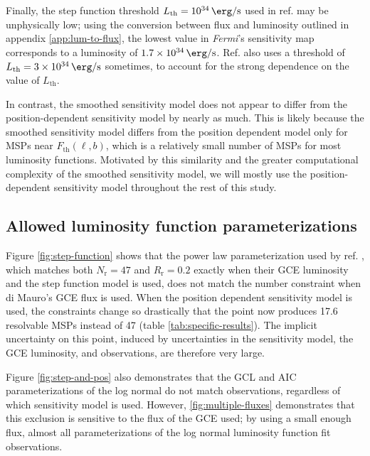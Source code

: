 \documentclass[a4paper,11pt]{article}
\newcommand{\comment}[1]{\emph{\color{red}{#1}}}
\begin{document}
Finally, the step function threshold $L_\text{th}=\SI{e34}{\erg\per\second}$ used in ref. \cite{Zhong:2019ycb} may be unphysically low; using the conversion between flux and luminosity outlined in appendix \ref{app:lum-to-flux}, the lowest value in \textit{Fermi}'s sensitivity map corresponds to a luminosity of $\SI{1.7e34}{\erg\per\second}$. Ref. \cite{Zhong:2019ycb} also uses a threshold of $L_\text{th}=\SI{3e34}{\erg\per\second}$ sometimes, to account for the strong dependence on the value of $L_\text{th}$. \comment{They don't actually say why they use 3e34. Is it fair to put words in their mouth? Also, maybe I should use 3e34. It wouldn't actually be that hard.}

In contrast, the smoothed sensitivity model does not appear to differ from the position-dependent sensitivity model by nearly as much. \comment{Except the power law, which may be a bug?} This is likely because the smoothed sensitivity model differs from the position dependent model only for MSPs near $F_\text{th}(\ell, b)$, which is a relatively small number of MSPs for most luminosity functions. Motivated by this similarity and the greater computational complexity of the smoothed sensitivity model, we will mostly use the position-dependent sensitivity model throughout the rest of this study.


\subsection{Allowed luminosity function parameterizations}
Figure \ref{fig:step-function} shows that the power law parameterization used by ref. \cite{Zhong:2019ycb}, which matches both $N_\text{r}=47$ and $R_\text{r}=0.2$ exactly when their GCE luminosity and the step function model is used, does not match the number constraint when di Mauro's GCE flux is used. When the position dependent sensitivity model is used, the constraints change so drastically that the point now produces 17.6 resolvable MSPs instead of 47 (table \ref{tab:specific-results}). The implicit uncertainty on this point, induced by uncertainties in the sensitivity model, the GCE luminosity, and observations, are therefore very large.

Figure \ref{fig:step-and-pos} also demonstrates that the GCL and AIC parameterizations of the log normal do not match observations, regardless of which sensitivity model is used. However, \ref{fig:multiple-fluxes} demonstrates that this exclusion is sensitive to the flux of the GCE used; by using a small enough flux, almost all parameterizations of the log normal luminosity function fit observations.
\end{document}
